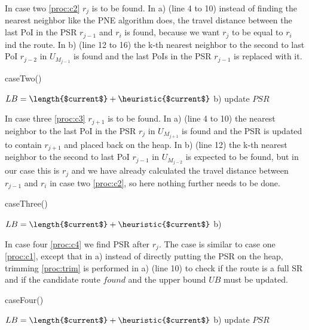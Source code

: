 In case two \ref{proc:c2} $r_j$ is to be found. In a) (line 4 to 10) instead of finding the nearest neighbor like the PNE algorithm does, the travel distance between the last PoI in the PSR $r_{j-1}$ and $r_i$ is found, because we want $r_j$ to be equal to $r_i$ ind the route. In b) (line 12 to 16) the k-th nearest neighbor to the second to last PoI $r_{j-2}$ in $U_{M_{j-1}}$ is found and the last PoIs in the PSR $r_{j-1}$ is replaced with it.

\begin{procedure}[H]
	\label{proc:c2}
	\caption{caseTwo()}
	
	$LB = \length{$current$} + \heuristic{$current$}$\;
	b) \;
	update $PSR$\;
\end{procedure}

In case three \ref{proc:c3} $r_{j+1}$ is to be found. In a) (line 4 to 10) the nearest neighbor to the last PoI in the PSR $r_j$ in $U_{M_{j+1}}$ is found and the PSR is updated to contain $r_{j+1}$ and placed back on the heap. In b) (line 12) the k-th nearest neighbor to the second to last PoI $r_{j-1}$ in $U_{M_{j-2}}$ is expected to be found, but in our case this is $r_j$ and we have already calculated the travel distance between $r_{j-1}$ and $r_i$ in case two \ref{proc:c2}, so here nothing further needs to be done.

\begin{procedure}[H]
	\label{proc:c3}
	\caption{caseThree()}
	
	$LB = \length{$current$} + \heuristic{$current$}$\;
	b) 
\end{procedure}

In case four \ref{proc:c4} we find PSR after $r_j$. The case is similar to case one \ref{proc:c1}, except that in a) instead of directly putting the PSR on the heap, trimming \ref{proc:trim} is performed in a) (line 10) to check if the route is a full SR and if the candidate route $found$ and the upper bound $UB$ must be updated.

\begin{procedure}[H]
	\label{proc:c4}
	\caption{caseFour()}
	
	$LB = \length{$current$} + \heuristic{$current$}$\;
	b) \;
	update $PSR$\;
\end{procedure}

